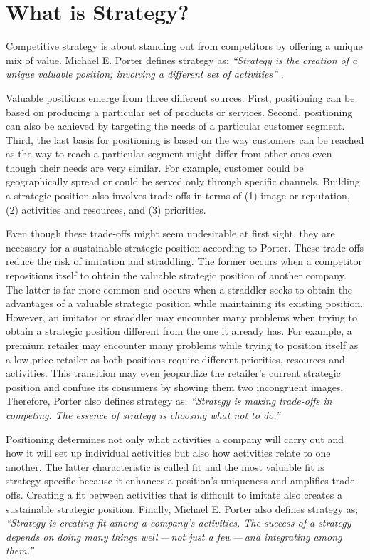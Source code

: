 \chapter{What is Strategy?}\label{ch:ekg-mm-what-is-strategy}

Competitive strategy is about standing out from competitors by offering a unique mix of value.
Michael E. Porter defines strategy as;
\textit{“Strategy is the creation of a unique valuable position; involving a different set of activities”}
\autocite{what_is_strategy}.

Valuable positions emerge from three different sources.
First, positioning can be based on producing a particular set of products or services.
Second, positioning can also be achieved by targeting the needs of a particular customer segment.
Third, the last basis for positioning is based on the way customers can be reached as the way to reach a
particular segment might differ from other ones even though their needs are very similar.
For example, customer could be geographically spread or could be served only through specific channels.
Building a strategic position also involves trade-offs in terms of
(1) image or reputation,
(2) activities and resources, and
(3) priorities.

Even though these trade-offs might seem undesirable at first sight,
they are necessary for a sustainable strategic position according to Porter.
These trade-offs reduce the risk of imitation and straddling.
The former occurs when a competitor repositions itself to obtain the valuable strategic position of another company.
The latter is far more common and occurs when a straddler seeks to obtain the advantages of
a valuable strategic position while maintaining its existing position.
However, an imitator or straddler may encounter many problems when trying to obtain a strategic position
different from the one it already has.
For example, a premium retailer may encounter many problems while trying to position itself as a low-price retailer
as both positions require different priorities, resources and activities.
This transition may even jeopardize the retailer's current strategic position and confuse its consumers
by showing them two incongruent images.
Therefore, Porter also defines strategy as;
\textit{“Strategy is making trade-offs in competing. The essence of strategy is choosing what not to do.”}

Positioning determines not only what activities a company will carry out and how it will set up individual
activities but also how activities relate to one another.
The latter characteristic is called fit and the most valuable fit is strategy-specific because it enhances a
position’s uniqueness and amplifies trade-offs.
Creating a fit between activities that is difficult to imitate also creates a sustainable strategic position.
Finally, Michael E. Porter also defines strategy as;
\textit{“Strategy is creating fit among a company’s activities.
The success of a strategy depends on doing many things well\,---\,not just a few\,---\,and
integrating among them.”}



